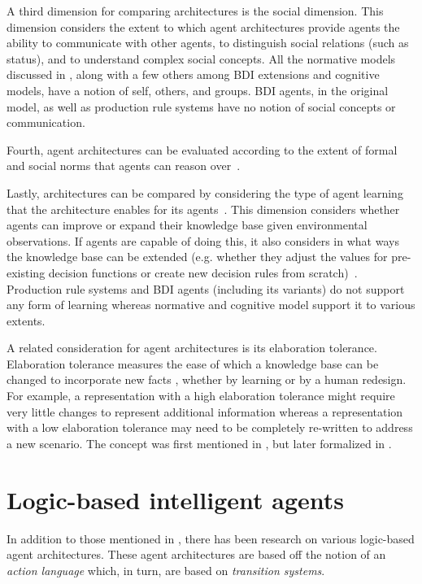 A third dimension for comparing architectures is the social dimension.
This dimension considers the extent to which agent architectures provide agents the ability to communicate with other agents, to distinguish social relations (such as status), and to understand complex social concepts.
All the normative models discussed in \cite{balke_how_2014}, along with a few others among BDI extensions and cognitive models, have a notion of self, others, and groups.
BDI agents, in the original model, as well as production rule systems have no notion of social concepts or communication.

Fourth, agent architectures can be evaluated according to the extent of formal and social norms that agents can reason over~\cite{balke_how_2014}.

Lastly, architectures can be compared by considering the type of agent learning that the architecture enables for its agents~\cite{balke_how_2014}.
This dimension considers whether agents can improve or expand their knowledge base given environmental observations.
If agents are capable of doing this, it also considers in what ways the knowledge base can be extended (e.g. whether they adjust the values for pre-existing decision functions or create new decision rules from scratch)~\cite{balke_how_2014}.
Production rule systems and BDI agents (including its variants) do not support any form of learning whereas normative and cognitive model support it to various extents.

A related consideration for agent architectures is its elaboration tolerance.
Elaboration tolerance measures the ease of which a knowledge base can be changed to incorporate new facts \cite{parmar_formalizing_2003}, whether by learning or by a human redesign.
For example, a representation with a high elaboration tolerance might require very little changes to represent additional information whereas a representation with a low elaboration tolerance may need to be completely re-written to address a new scenario.
The concept was first mentioned in \cite{mccarthy_mathematical_1988}, but later formalized in \cite{parmar_formalizing_2003}.

\section{Logic-based intelligent agents}
\label{sec:logic_based_agents}

In addition to those mentioned in \cite{balke_how_2014}, there has been research on various logic-based agent architectures.
These agent architectures are based off the notion of an \textit{action language} which, in turn, are based on \textit{transition systems}.


